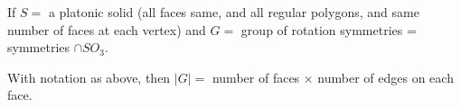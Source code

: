 \begin{definition}
    If \(S =\) a platonic solid (all faces same, and all regular polygons, and same number of faces at each vertex) and \(G = \) group of rotation symmetries = symmetries \(\cap SO_3\).
\end{definition}

\begin{proposition}
    With notation as above, then \(|G| = \) number of faces \(\times \) number of edges on each face.
\end{proposition}